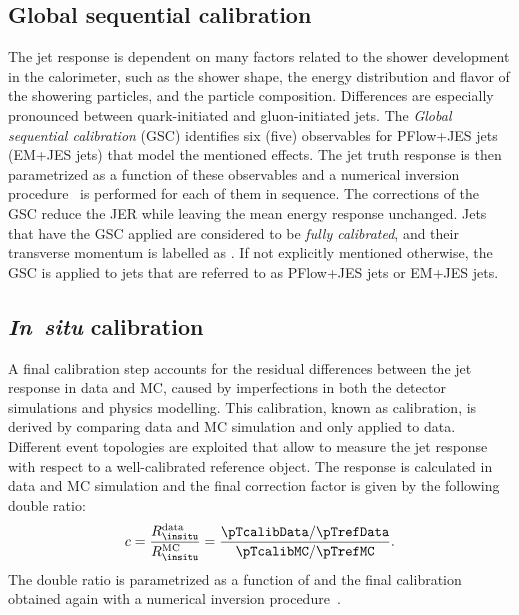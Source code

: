 \subsection{Global sequential calibration}
The jet response is dependent on many factors related to the shower development in the calorimeter, such as the shower shape, the energy distribution and flavor of the showering particles, and the particle composition.
Differences are especially pronounced between quark-initiated and gluon-initiated jets.
The \emph{Global sequential calibration} (GSC) identifies six (five) observables for PFlow+JES jets (EM+JES jets) that model the mentioned effects. The jet truth response is then parametrized as a function of these observables and a numerical inversion procedure~\cite{PERF-2011-03} is performed for each of them in sequence.
The corrections of the GSC reduce the JER while leaving the mean energy response unchanged.
Jets that have the GSC applied are considered to be \emph{fully calibrated}, and their transverse momentum is labelled as \pTcalib. If not explicitly mentioned otherwise, the GSC is applied to jets that are referred to as PFlow+JES jets or EM+JES jets.

\subsection{\textbf{\emph{In~situ}} calibration}
\label{subsec:insitu-calibration}
A final calibration step accounts for the residual differences between the jet response in data and MC, caused by imperfections in both the detector simulations and physics modelling. This calibration, known as \emph{\insitu} calibration, is derived by comparing data and MC simulation and only applied to data.
Different event topologies are exploited that allow to measure the jet response with respect to a well-calibrated reference object. The \insitu response is calculated in data and MC simulation and the final correction factor is given by the following double ratio:
\begin{equation}
    c = \frac{R_{\insitu}^{\text{data}}}{R_{\insitu}^{\text{MC}}} = \frac{ \pTcalibData / \pTrefData}{\pTcalibMC / \pTrefMC}.
\end{equation}
The double ratio is parametrized as a function of \pTref and the final calibration obtained again with a numerical inversion procedure~\cite{PERF-2011-03}.


